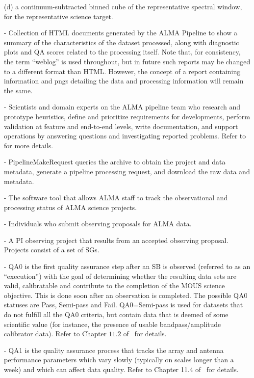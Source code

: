 \begin{description}
(d) a continuum-subtracted binned cube of the representative spectral window, for the representative science target.
\item[Pipeline Weblog (weblog)] - Collection of HTML documents generated by the ALMA Pipeline to show a summary of the characteristics of the dataset processed, along with diagnostic plots and QA scores related to the processing itself. Note that, for consistency, the term ``weblog'' is used throughout, but in future such reports may be changed to a different format than HTML. However, the concept of a report containing information and pngs detailing the data and processing information will remain the same.
\item[Pipeline Working Group (PLWG)] - Scientists and domain experts on the ALMA pipeline team who research and prototype heuristics, define and prioritize requirements for developments, perform validation at feature and end-to-end levels, write documentation, and support operations by answering questions and investigating reported problems. Refer to~\cite{dp,dpda} for more details. 
\item[PipelineMakeRequest] - PipelineMakeRequest queries the archive to obtain the project and data metadata, generate a pipeline processing request, and download the raw data and metadata.
\item[Project Tracker (ProTrack)] - The software tool that allows ALMA staff to track the observational and processing status of ALMA science projects.
\item[Principal Investigator (PI)] - Individuals who submit observing proposals for ALMA data.
\item[Project] - A PI observing project that results from an accepted observing proposal. Projects consist of a set of SGs.
\item[Quality Assurance Level 0 (QA0)] - QA0 is the first quality assurance step after an SB is observed (referred to as an ``execution'') with the goal of determining whether the resulting data sets are valid, calibratable and contribute to the completion of the MOUS science objective. This is done soon after an observation is completed. The possible QA0 statuses are Pass, Semi-pass and Fail. QA0=Semi-pass is used for datasets that do not fulfill all the QA0 criteria, but contain data that is deemed of some scientific value (for instance, the presence of usable bandpass/amplitude calibrator data). Refer to Chapter $11.2$ of~\cite{c12_thb} for details.
\item[Quality Assurance Level 1 (QA1)] - QA1 is the quality assurance process that tracks the array and antenna performance parameters which vary slowly (typically on scales longer than a week) and which can affect data quality. Refer to Chapter 11.4 of~\cite{c12_thb} for details. 

\end{description}
